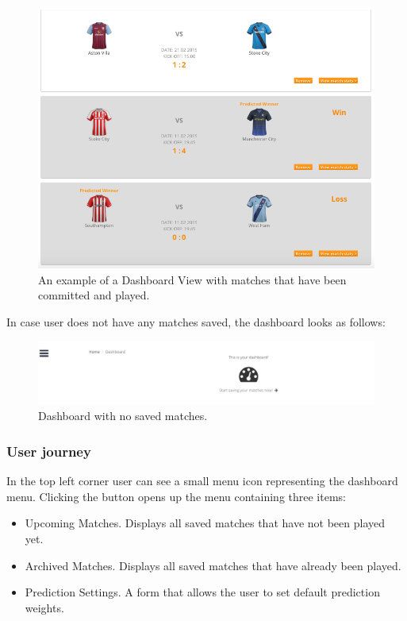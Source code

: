 \begin{figure}[H]
	\begin{center}
		\includegraphics[width=.90\textwidth]{impl/images/dashboardCommittedMatches}
		\caption{An example of a Dashboard View with matches that have been committed and played.} \label{fig:dashboardcommittedmatches}
	\end{center}
\end{figure}

In case user does not have any matches saved, the dashboard looks as follows:

\begin{figure}[H]
	\begin{center}
		\includegraphics[width=.90\textwidth]{impl/images/noSavedMatches}
		\caption{Dashboard with no saved matches.} \label{fig:using: nosavedmatches}
	\end{center}
\end{figure}

\subsubsection*{User journey}
\label{subsec:dashboarduserjourney}
In the top left corner user can see a small menu icon representing the dashboard menu. Clicking the button opens up the menu containing three items:

\begin{itemize}
	\item{Upcoming Matches. Displays all saved matches that have not been played yet. }
	\item{Archived Matches. Displays all saved matches that have already been played.}
	\item{Prediction Settings. A form that allows the user to set default prediction weights.}
\end{itemize}

